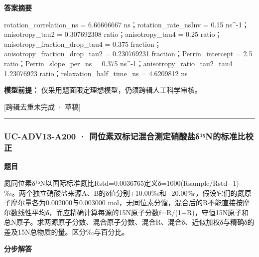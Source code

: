\documentclass[UTF8,11pt,a4paper]{ctexart}
\begin{document}
\noindent\textbf{答案摘要}\par
rotation\_correlation\_ns = 6.66666667 ns；rotation\_rate\_nsInv = 0.15 ns\textasciicircum{}-1；anisotropy\_tau2 = 0.307692308 ratio；anisotropy\_tau4 = 0.25 ratio；anisotropy\_fraction\_drop\_tau4 = 0.375 fraction；anisotropy\_fraction\_drop\_tau2 = 0.230769231 fraction；Perrin\_intercept = 2.5 ratio；Perrin\_slope\_per\_ns = 0.375 ns\textasciicircum{}-1；anisotropy\_ratio\_tau2\_tau4 = 1.23076923 ratio；relaxation\_half\_time\_ns = 4.6209812 ns\par
\noindent\textbf{模型前提：}
仅采用题面限定理想模型，仍须跨辑人工科学审核。\par
\noindent\textcolor{red!65!black}{[跨辑去重未完成 · 草稿]} \par
\medskip\hrule\medskip
{}
\subsubsection*{UC-ADV13-A200 · 同位素双标记混合测定硝酸盐δ¹⁵N的标准比校正}
\noindent\textbf{题目}\par
氮同位素δ¹⁵N以国际标准氮比Rstd=0.0036765定义δ=1000(Rsample/Rstd−1) ‰。两个独立硝酸盐来源A、B的δ值分别+10.00‰和−20.00‰，假设它们的氮原子摩尔量各为0.002000与0.003000 mol，无同位素分馏，混合后的R不能直接按摩尔数线性平均δ，而应精确计算每源的15N原子分数f=R/(1+R)，守恒15N原子和总N原子。求两源原子分数、混合原子分数、混合R、混合δ、近似加权δ与精确δ的差及15N总物质的量。区分‰与百分比。\par
\medskip\noindent\textbf{分步解答}
\end{document}
